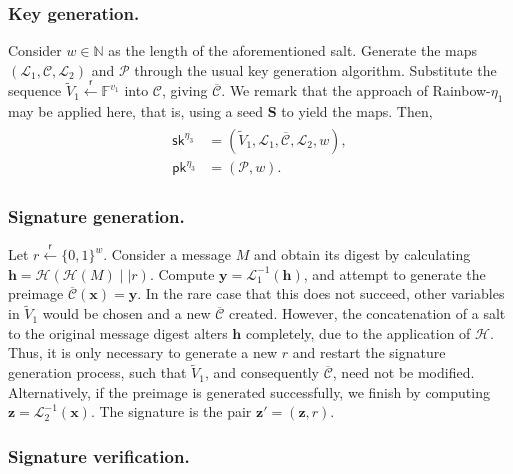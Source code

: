 \documentclass[12pt, a4paper, oneside]{memoir}
\newcommand{\random}{\overset{\mathsf{r}}{\gets}}
\theoremstyle{definition}
\begin{document}
\subsubsection{Key generation.}

Consider $w \in \mathbb{N}$ as the length of the aforementioned salt. Generate the maps $(\mathcal{L}_{1}, \mathcal{C}, \mathcal{L}_{2})$ and $\mathcal{P}$ through the usual key generation algorithm. Substitute the sequence $\widetilde{V}_{1} \random \mathbb{F}^{v_{1}}$ into $\mathcal{C}$, giving $\overline{\mathcal{C}}$. We remark that the approach of Rainbow-$\eta_{1}$ may be applied here, that is, using a seed $\mathbf{S}$ to yield the maps. Then,
\begin{align}
  \begin{split}
    \mathsf{sk}^{\eta_{3}} &= (\widetilde{V}_{1}, \mathcal{L}_{1}, \overline{\mathcal{C}}, \mathcal{L}_{2}, w), \\
    \mathsf{pk}^{\eta_{3}} &= (\mathcal{P}, w).
  \end{split}
\end{align}

\subsubsection{Signature generation.}

Let $r \random {\{0, 1\}}^{w}$. Consider a message $M$ and obtain its digest by calculating $\mathbf{h} = \mathcal{H}(\mathcal{H}(M) \mid\mid r)$. Compute $\mathbf{y} = \mathcal{L}_{1}^{-1}(\mathbf{h})$, and attempt to generate the preimage $\overline{\mathcal{C}}(\mathbf{x}) = \mathbf{y}$. In the rare case that this does not succeed, other variables in $\widetilde{V}_{1}$ would be chosen and a new $\overline{\mathcal{C}}$ created. However, the concatenation of a salt to the original message digest alters $\mathbf{h}$ completely, due to the application of $\mathcal{H}$. Thus, it is only necessary to generate a new $r$ and restart the signature generation process, such that $\widetilde{V}_{1}$, and consequently $\overline{\mathcal{C}}$, need not be modified. Alternatively, if the preimage is generated successfully, we finish by computing $\mathbf{z} = \mathcal{L}_{2}^{-1}(\mathbf{x})$. The signature is the pair $\mathbf{z'} = (\mathbf{z}, r)$.

\subsubsection{Signature verification.}
\end{document}

